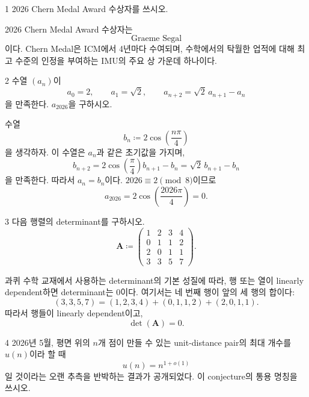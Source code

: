 
\begin{problem}{1}
2026 Chern Medal Award 수상자를 쓰시오.
\end{problem}

\begin{solution}
2026 Chern Medal Award 수상자는
\[
    \boxed{\text{Graeme Segal}}
\]
이다. Chern Medal은 ICM에서 4년마다 수여되며, 수학에서의 탁월한 업적에 대해 최고 수준의 인정을 부여하는 IMU의 주요 상 가운데 하나이다.
\end{solution}

\begin{problem}{2}
수열 $(a_n)$이
\[
    a_0=2,
    \qquad
    a_1=\sqrt2,
    \qquad
    a_{n+2}=\sqrt2\,a_{n+1}-a_n
\]
을 만족한다. $a_{2026}$을 구하시오.
\end{problem}

\begin{solution}
수열
\[
    b_n\coloneqq 2\cos\left(\frac{n\pi}{4}\right)
\]
을 생각하자. 이 수열은 $a_n$과 같은 초기값을 가지며,
\[
    b_{n+2}
    =
    2\cos\left(\frac{\pi}{4}\right)b_{n+1}-b_n
    =
    \sqrt2\,b_{n+1}-b_n
\]
을 만족한다. 따라서 $a_n=b_n$이다. $2026\equiv2\pmod8$이므로
\[
    \boxed{
        a_{2026}
        =
        2\cos\left(\frac{2026\pi}{4}\right)
        =0
    }.
\]
\end{solution}

\begin{problem}{3}
다음 행렬의 determinant를 구하시오.
\[
    \mathbf{A}
    \coloneqq
    \begin{pmatrix}
        1&2&3&4\\
        0&1&1&2\\
        2&0&1&1\\
        3&3&5&7
    \end{pmatrix}.
\]
\end{problem}

\begin{solution}
과퀴 수학 교재에서 사용하는 determinant의 기본 성질에 따라, 행 또는 열이 linearly dependent하면 determinant는 $0$이다. 여기서는 네 번째 행이 앞의 세 행의 합이다:
\[
    (3,3,5,7)
    =
    (1,2,3,4)
    +(0,1,1,2)
    +(2,0,1,1).
\]
따라서 행들이 linearly dependent이고,
\[
    \boxed{\det(\mathbf{A})=0}.
\]
\end{solution}

\begin{problem}{4}
2026년 5월, 평면 위의 $n$개 점이 만들 수 있는 unit-distance pair의 최대 개수를 $u(n)$이라 할 때
\[
    u(n)=n^{1+o(1)}
\]
일 것이라는 오랜 추측을 반박하는 결과가 공개되었다. 이 conjecture의 통용 명칭을 쓰시오.
\end{problem}

